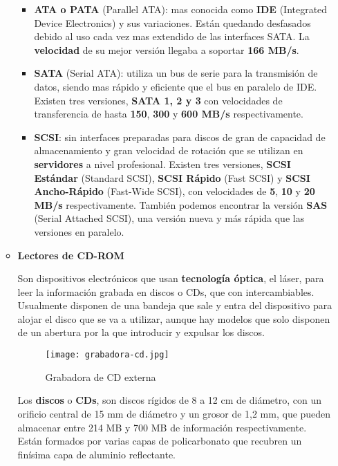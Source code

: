 \begin{itemize}
\begin{itemize}
      \begin{itemize}
          \item \textbf{ATA o PATA} (Parallel ATA): mas conocida como \textbf{IDE} (Integrated Device Electronics) y sus variaciones. Están quedando desfasados debido al uso cada vez mas extendido de las interfaces SATA. La \textbf{velocidad} de su mejor versión llegaba a soportar \textbf{166 MB/s}.

          \item \textbf{SATA} (Serial ATA): utiliza un bus de serie para la transmisión de datos, siendo mas rápido y eficiente que el bus en paralelo de IDE. Existen tres versiones, \textbf{SATA 1, 2 y 3} con velocidades de transferencia de hasta \textbf{150}, \textbf{300} y \textbf{600 MB/s} respectivamente.

          \item \textbf{SCSI}: sin interfaces preparadas para discos de gran de capacidad de almacenamiento y gran velocidad de rotación que se utilizan en \textbf{servidores} a nivel profesional. Existen tres versiones, \textbf{SCSI Estándar} (Standard SCSI), \textbf{SCSI Rápido} (Fast SCSI) y \textbf{SCSI Ancho-Rápido} (Fast-Wide SCSI), con velocidades de \textbf{5}, \textbf{10} y \textbf{20 MB/s} respectivamente. También podemos encontrar la versión \textbf{SAS} (Serial Attached SCSI), una versión nueva y más rápida que las versiones en paralelo.
      \end{itemize}

    \item \textbf{Lectores de CD-ROM}

    Son dispositivos electrónicos que usan \textbf{tecnología óptica}, el láser, para leer la información grabada en discos o CDs, que con intercambiables. Usualmente disponen de una bandeja que sale y entra del dispositivo para alojar el disco que se va a utilizar, aunque hay modelos que solo disponen de un abertura por la que introducir y expulsar los discos.

    \begin{figure}[ht]
        \centering
        \texttt{[image: grabadora-cd.jpg]}
        \caption{Grabadora de CD externa}
    \end{figure}

    Los \textbf{discos} o \textbf{CDs}, son discos rígidos de 8 a 12 cm de diámetro, con un orificio central de 15 mm de diámetro y un grosor de 1,2 mm, que pueden almacenar entre 214 MB y 700 MB de información respectivamente. Están formados por varias capas de policarbonato que recubren un finísima capa de aluminio reflectante.


\end{itemize}
\end{itemize}
